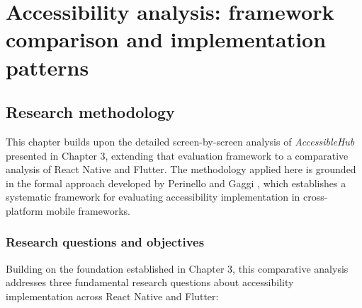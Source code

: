 \chapter{Accessibility analysis: framework comparison and implementation patterns} 
\label{chap:implementation}

\section{Research methodology}
This chapter builds upon the detailed screen-by-screen analysis of \textit{AccessibleHub} presented in Chapter 3, extending that evaluation framework to a comparative analysis of React Native and Flutter. The methodology applied here is grounded in the formal approach developed by Perinello and Gaggi \cite{perinello2024accessibility}, which establishes a systematic framework for evaluating accessibility implementation in cross-platform mobile frameworks.

\subsection{Research questions and objectives}

Building on the foundation established in Chapter 3, this comparative analysis addresses three fundamental research questions about accessibility implementation across React Native and Flutter:

